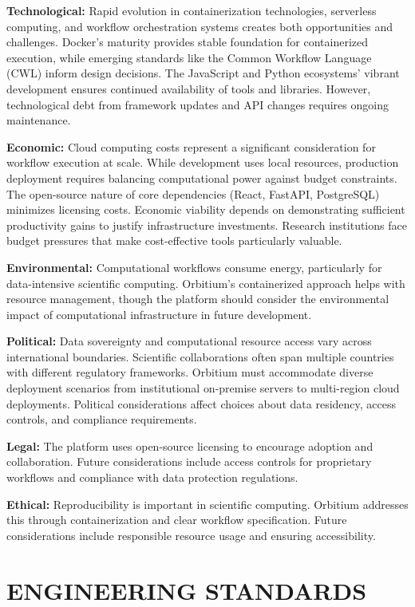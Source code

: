 \documentclass[12pt]{article}
\begin{document}
\textbf{Technological:} Rapid evolution in containerization technologies, serverless computing, and workflow orchestration systems creates both opportunities and challenges. Docker's maturity provides stable foundation for containerized execution, while emerging standards like the Common Workflow Language (CWL)  inform design decisions. The JavaScript and Python ecosystems' vibrant development ensures continued availability of tools and libraries. However, technological debt from framework updates and API changes requires ongoing maintenance.

\textbf{Economic:} Cloud computing costs represent a significant consideration for workflow execution at scale. While development uses local resources, production deployment requires balancing computational power against budget constraints. The open-source nature of core dependencies (React, FastAPI, PostgreSQL) minimizes licensing costs. Economic viability depends on demonstrating sufficient productivity gains to justify infrastructure investments. Research institutions face budget pressures that make cost-effective tools particularly valuable.

\textbf{Environmental:} Computational workflows consume energy, particularly for data-intensive scientific computing. Orbitium's containerized approach helps with resource management, though the platform should consider the environmental impact of computational infrastructure in future development.

\textbf{Political:} Data sovereignty and computational resource access vary across international boundaries. Scientific collaborations often span multiple countries with different regulatory frameworks. Orbitium must accommodate diverse deployment scenarios from institutional on-premise servers to multi-region cloud deployments. Political considerations affect choices about data residency, access controls, and compliance requirements.

\textbf{Legal:} The platform uses open-source licensing to encourage adoption and collaboration. Future considerations include access controls for proprietary workflows and compliance with data protection regulations.

\textbf{Ethical:} Reproducibility is important in scientific computing. Orbitium addresses this through containerization and clear workflow specification. Future considerations include responsible resource usage and ensuring accessibility.

\newpage
\section{ENGINEERING STANDARDS}
\end{document}
